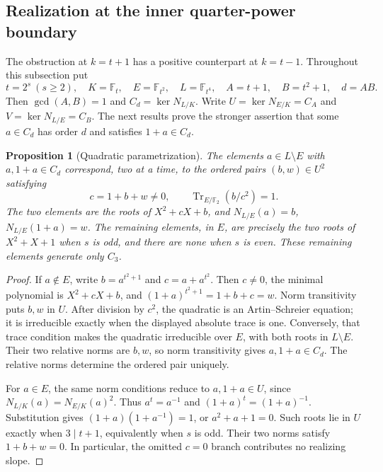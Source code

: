 \documentclass[11pt]{article}
\newtheorem{proposition}[theorem]{Proposition}
\begin{document}
\subsection{Realization at the inner quarter-power boundary}
\label{subsec:inner-critical}

The obstruction at $k=t+1$ has a positive counterpart at $k=t-1$.
Throughout this subsection put
\[
 t=2^s\ (s\ge2),\quad K=\mathbb F_t,\quad E=\mathbb F_{t^2},
 \quad L=\mathbb F_{t^4},\quad A=t+1,\quad B=t^2+1,\quad d=AB.
\]
Then $\gcd(A,B)=1$ and $C_d=\ker N_{L/K}$.
Write $U=\ker N_{E/K}=C_A$ and $V=\ker N_{L/E}=C_B$.
The next results prove the stronger assertion that some $a\in C_d$
has order $d$ and satisfies $1+a\in C_d$.

\begin{proposition}[Quadratic parametrization]\label{prop:inner-quadratic}
The elements $a\in L\setminus E$ with $a,1+a\in C_d$ correspond,
two at a time, to the ordered pairs $(b,w)\in U^2$ satisfying
\[
 c=1+b+w\ne0,\qquad
 \operatorname{Tr}_{E/\mathbb F_2}(b/c^2)=1.
\]
The two elements are the roots of $X^2+cX+b$, and
$N_{L/E}(a)=b$, $N_{L/E}(1+a)=w$.
The remaining elements, in $E$, are precisely the two roots of
$X^2+X+1$ when $s$ is odd, and there are none when $s$ is even.
These remaining elements generate only $C_3$.
\end{proposition}
\begin{proof}
If $a\notin E$, write $b=a^{t^2+1}$ and $c=a+a^{t^2}$.
Then $c\ne0$, the minimal polynomial is $X^2+cX+b$, and
$(1+a)^{t^2+1}=1+b+c=w$. Norm transitivity puts $b,w$ in $U$.
After division by $c^2$, the quadratic is an Artin--Schreier equation;
it is irreducible exactly when the displayed absolute trace is one.
Conversely, that trace condition makes the quadratic irreducible over
$E$, with both roots in $L\setminus E$. Their two relative norms are
$b,w$, so norm transitivity gives $a,1+a\in C_d$.
The relative norms determine the ordered pair uniquely.

For $a\in E$, the same norm conditions reduce to $a,1+a\in U$, since
$N_{L/K}(a)=N_{E/K}(a)^2$. Thus $a^t=a^{-1}$ and
$(1+a)^t=(1+a)^{-1}$. Substitution gives
$(1+a)(1+a^{-1})=1$, or $a^2+a+1=0$.
Such roots lie in $U$ exactly when $3\mid t+1$, equivalently when
$s$ is odd. Their two norms satisfy $1+b+w=0$.
In particular, the omitted $c=0$ branch contributes no realizing slope.
\end{proof}
\end{document}
